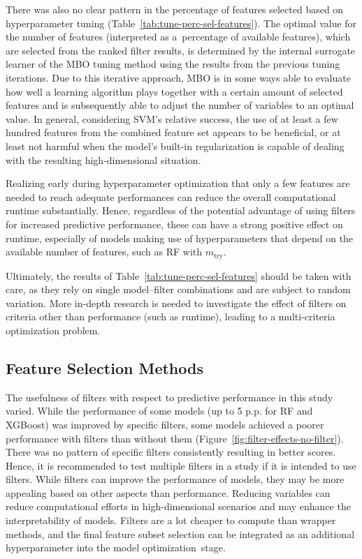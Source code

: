 \documentclass[remotesensing,article,accept,moreauthors,pdftex]{Definitions/mdpi}
\begin{document}
\begin{paracol}{2}
There was also no clear pattern in the percentage of features selected based on hyperparameter tuning (Table~\ref{tab:tune-perc-sel-features}).
The optimal value for the number of features (interpreted as a\ percentage of available features), which are selected from the ranked filter results, is determined by the internal surrogate learner of the MBO tuning method using the results from the previous tuning iterations.
Due to this iterative approach, MBO is in some ways able to evaluate how well a learning algorithm plays together with a certain amount of selected features and is subsequently able to adjust the number of variables to an optimal value.
In general, considering SVM's relative success, the use of at least a few hundred features from the combined feature set appears to be beneficial, or at least not harmful when the model's built-in regularization is capable of dealing with the resulting high-dimensional situation.

Realizing early during hyperparameter optimization that only a few features are needed to reach adequate performances can reduce the overall computational runtime substantially.
Hence, regardless of the potential advantage of using filters for increased predictive performance, these can have a strong positive effect on runtime, especially of models making use of hyperparameters that depend on the available number of features, such as RF with $m_\textrm{try}$.

Ultimately, the results of Table~\ref{tab:tune-perc-sel-features} should be taken with care, as they rely on single model--filter combinations and are subject to random variation.
More in-depth research is needed to investigate the effect of filters on criteria other than performance (such as runtime), leading to a multi-criteria optimization problem.

\subsection{Feature Selection Methods}

The usefulness of filters with respect to predictive performance in this study varied.
While the performance of some models (up to 5 p.p. for RF and XGBoost) was improved by specific filters, some models achieved a poorer performance with filters than without them (Figure~\ref{fig:filter-effects-no-filter}).
There was no pattern of specific filters consistently resulting in better scores.
Hence, it is recommended to test multiple filters in a study if it is intended to use filters.
While filters can improve the performance of models, they may be more appealing based on other aspects than performance. Reducing variables can reduce computational efforts in high-dimensional scenarios and may enhance the interpretability of models.
Filters are a lot cheaper to compute than wrapper methods, and the final feature subset selection can be integrated as an additional hyperparameter into the model optimization~stage.


\end{paracol}
\end{document}
